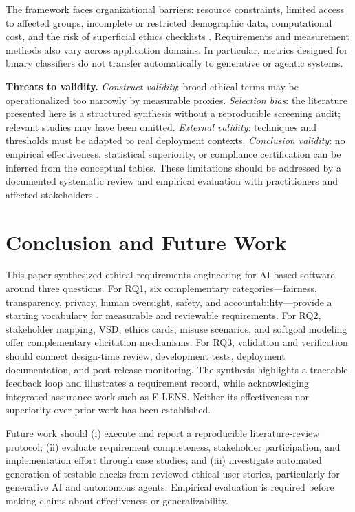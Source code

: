 \documentclass[11pt,a4paper]{article}
\begin{document}
The framework faces organizational barriers: resource constraints, limited access to affected groups, incomplete or restricted demographic data, computational cost, and the risk of superficial ethics checklists \cite{floridi2019,morley2020}. Requirements and measurement methods also vary across application domains. In particular, metrics designed for binary classifiers do not transfer automatically to generative or agentic systems.

\textbf{Threats to validity.} \emph{Construct validity}: broad ethical terms may be operationalized too narrowly by measurable proxies. \emph{Selection bias}: the literature presented here is a structured synthesis without a reproducible screening audit; relevant studies may have been omitted. \emph{External validity}: techniques and thresholds must be adapted to real deployment contexts. \emph{Conclusion validity}: no empirical effectiveness, statistical superiority, or compliance certification can be inferred from the conceptual tables. These limitations should be addressed by a documented systematic review and empirical evaluation with practitioners and affected stakeholders \cite{wohlin2012}.

\section{Conclusion and Future Work}
This paper synthesized ethical requirements engineering for AI-based software around three questions. For RQ1, six complementary categories---fairness, transparency, privacy, human oversight, safety, and accountability---provide a starting vocabulary for measurable and reviewable requirements. For RQ2, stakeholder mapping, VSD, ethics cards, misuse scenarios, and softgoal modeling offer complementary elicitation mechanisms. For RQ3, validation and verification should connect design-time review, development tests, deployment documentation, and post-release monitoring. The synthesis highlights a traceable feedback loop and illustrates a requirement record, while acknowledging integrated assurance work such as E-LENS. Neither its effectiveness nor superiority over prior work has been established.

Future work should (i) execute and report a reproducible literature-review protocol; (ii) evaluate requirement completeness, stakeholder participation, and implementation effort through case studies; and (iii) investigate automated generation of testable checks from reviewed ethical user stories, particularly for generative AI and autonomous agents. Empirical evaluation is required before making claims about effectiveness or generalizability.
\end{document}
